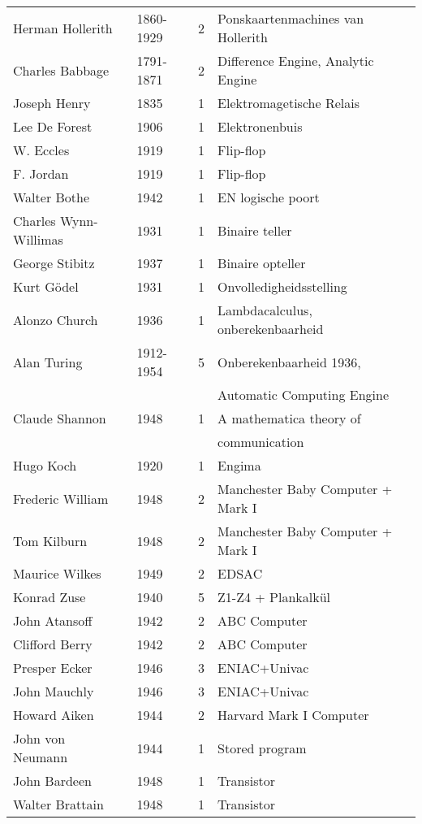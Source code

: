 \documentclass[../main.tex]{subfiles}
\begin{document}
\begin{longtable}{llll}
Herman Hollerith		&	1860-1929	&	2		&	Ponskaartenmachines van Hollerith	\\
Charles Babbage			&	1791-1871	&	2		&	Difference Engine, Analytic Engine	\\
Joseph Henry			&	1835		&	1		&	Elektromagetische Relais	\\
Lee De Forest			&	1906		&	1		&	Elektronenbuis	\\
W. Eccles				&	1919		&	1		&	Flip-flop	\\
F. Jordan				&	1919		&	1		&	Flip-flop	\\
Walter Bothe			&	1942		&	1		&	EN logische poort	\\
Charles Wynn-Willimas	&	1931		&	1		&	Binaire teller	\\
George Stibitz			&	1937		&	1		&	Binaire opteller	\\
Kurt Gödel				&	1931		&	1		&	Onvolledigheidsstelling	\\
Alonzo Church			&	1936		&	1		&	Lambdacalculus, onberekenbaarheid	\\
Alan Turing				&	1912-1954	&	5		&	Onberekenbaarheid 1936, 	\\
					 	&				&			&	Automatic Computing Engine \\
Claude Shannon			&	1948		&	1		&	A mathematica theory of 	\\
					 	&				&			&	communication \\
Hugo Koch				&	1920		&	1		&	Engima	\\
Frederic William		&	1948		&	2		&	Manchester Baby Computer + Mark I	\\
Tom Kilburn				&	1948		&	2		&	Manchester Baby Computer + Mark I	\\
Maurice Wilkes			&	1949		&	2		&	EDSAC	\\
Konrad Zuse				&	1940		&	5		&	Z1-Z4 + Plankalkül	\\
John Atansoff			&	1942		&	2		&	ABC Computer	\\
Clifford Berry			&	1942		&	2		&	ABC Computer	\\
Presper Ecker			&	1946		&	3		&	ENIAC+Univac	\\
John Mauchly			&	1946		&	3		&	ENIAC+Univac	\\
Howard Aiken			&	1944		&	2		&	Harvard Mark I Computer	\\
John von Neumann		&	1944		&	1		&	Stored program	\\
John Bardeen			&	1948		&	1		&	Transistor	\\
Walter Brattain			&	1948		&	1		&	Transistor	\\

\end{longtable}
\end{document}
